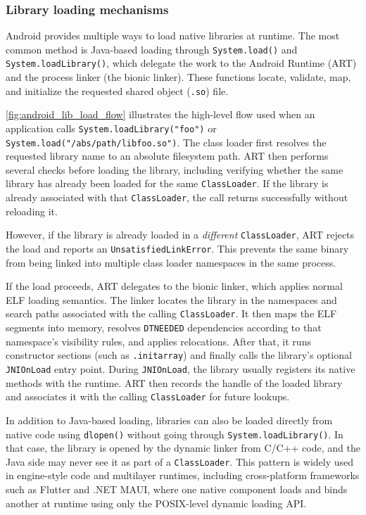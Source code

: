 \documentclass[11pt,a4paper]{report}
\renewcommand\_{{\textunderscore\allowbreak}}
\begin{document}
\subsubsection{Library loading mechanisms}

Android provides multiple ways to load native libraries at runtime. The most common method is Java-based loading through \texttt{System.load()} and \texttt{System.loadLibrary()}, which delegate the work to the Android Runtime (ART) and the process linker (the bionic linker). These functions locate, validate, map, and initialize the requested shared object (\texttt{.so}) file.

\cref{fig:android_lib_load_flow} illustrates the high-level flow used when an application calls \texttt{System.loadLibrary("foo")} or \texttt{System.load("/abs/path/libfoo.so")}. The class loader first resolves the requested library name to an absolute filesystem path. ART then performs several checks before loading the library, including verifying whether the same library has already been loaded for the same \texttt{ClassLoader}. If the library is already associated with that \texttt{ClassLoader}, the call returns successfully without reloading it.

However, if the library is already loaded in a \emph{different} \texttt{ClassLoader}, ART rejects the load and reports an \texttt{UnsatisfiedLinkError}. This prevents the same binary from being linked into multiple class loader namespaces in the same process.

If the load proceeds, ART delegates to the bionic linker, which applies normal ELF loading semantics. The linker locates the library in the namespaces and search paths associated with the calling \texttt{ClassLoader}. It then maps the ELF segments into memory, resolves \texttt{DT\_NEEDED} dependencies according to that namespace's visibility rules, and applies relocations. After that, it runs constructor sections (such as \texttt{.init\_array}) and finally calls the library's optional \texttt{JNI\_OnLoad} entry point. During \texttt{JNI\_OnLoad}, the library usually registers its native methods with the runtime. ART then records the handle of the loaded library and associates it with the calling \texttt{ClassLoader} for future lookups.

In addition to Java-based loading, libraries can also be loaded directly from native code using \texttt{dlopen()} without going through \texttt{System.loadLibrary()}. In that case, the library is opened by the dynamic linker from C/C++ code, and the Java side may never see it as part of a \texttt{ClassLoader}. This pattern is widely used in engine-style code and multilayer runtimes, including cross-platform frameworks such as Flutter and .NET MAUI, where one native component loads and binds another at runtime using only the POSIX-level dynamic loading API.
\end{document}
